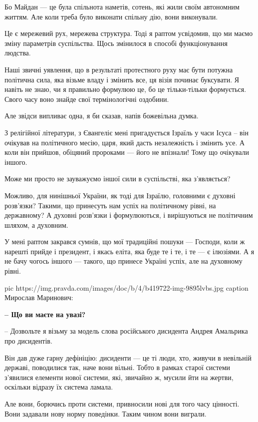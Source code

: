 Бо Майдан --- це була спільнота наметів, сотень, які жили своїм автономним
життям. Але коли треба було виконати спільну дію, вони виконували.

Це є мережевий рух, мережева структура. Тоді я раптом усвідомив, що ми маємо
зміну параметрів суспільства. Щось змінилося в способі функціонування людства. 

Наші звичні уявлення, що в результаті протестного руху має бути потужна
політична сила, яка візьме владу і змінить все, ця візія починає буксувати. Я
навіть не знаю, чи я правильно формулюю це, бо це тільки-тільки формується.
Свого часу воно знайде свої термінологічні оздобини.

Але звідси випливає одна, я би сказав, напів божевільна думка. 

З релігійної літератури, з Євангеліє мені пригадується Ізраїль у часи Ісуса –
він очікував на політичного месію, царя, який дасть незалежність і змінить усе.
А коли він прийшов, обіцяний пророками --- його не впізнали! Тому що очікували
іншого. 

Може ми просто не зауважуємо іншої сили в суспільстві, яка з’являється?  

Можливо, для нинішньої України, як тоді для Ізраїлю, головними є духовні
розв’язки? Такими, що принесуть нам успіх на політичному рівні, на державному?
А духовні розв’язки і формулюються, і вирішуються не політичним шляхом, а
духовним. 

У мені раптом закрався сумнів, що мої традиційні пошуки --- Господи, коли ж
нарешті прийде і президент, і якась еліта, яка буде те і те, і те --- є ілюзіями.
А я не бачу чогось іншого --- такого, що принесе Україні успіх, але на духовному
рівні.

\ifcmt
pic https://img.pravda.com/images/doc/b/4/b419722-img-9895lvbs.jpg
caption Мирослав Маринович: 
\fi

{\bfseries 
– Що ви маєте на увазі?
}

– Дозвольте я візьму за модель слова російського дисидента Андрея Амальрика про
дисидентів.

Він дав дуже гарну дефініцію: дисиденти --- це ті люди, хто, живучи в невільній
державі, поводилися так, наче вони вільні. Тобто в рамках старої системи
з’явилися елементи нової системи, які, звичайно ж, мусили йти на жертви,
оскільки відразу їх система ламала. 

Але вони, борючись проти системи, привносили нові для того часу цінності. Вони
задавали нову норму поведінки. Таким чином вони виграли. 

